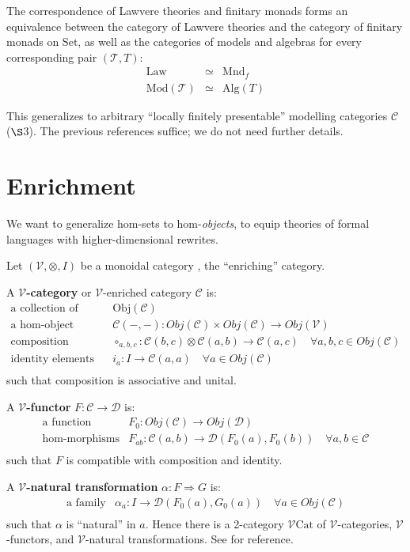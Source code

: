 \documentclass{amsart}
\theoremstyle{definition}
\newcommand{\Set}{\mathrm{Set}}
\newcommand{\Cat}{\mathrm{Cat}}
\newcommand{\Alg}{\mathrm{Alg}}
\newcommand{\Mod}{\mathrm{Mod}}
\newcommand{\V}{\mathscr{V}}
\newcommand{\D}{\mathscr{D}}
\newcommand{\C}{\mathscr{C}}
\newcommand{\T}{\mathscr{T}}
\newcommand{\maps}{\colon}
\begin{document}
The correspondence of Lawvere theories and finitary monads forms an equivalence between the category of Lawvere theories and the category of finitary monads on $\Set$, as well as the categories of models and algebras for every corresponding pair $(\T, T)$:
\[\begin{array}{rcl}
	\mathrm{Law} & \simeq & \mathrm{Mnd}_f\\
	\Mod(\T) & \simeq & \Alg(T)
\end{array}\]

This generalizes to arbitrary ``locally finitely presentable'' modelling categories $\C$ ($\S$3). The previous references suffice; we do not need further details. 

\section{Enrichment}
We want to generalize hom-sets to hom-\textit{objects}, to equip theories of formal languages with higher-dimensional rewrites.

Let $(\V,\otimes,I)$ be a monoidal category \cite{maclane}, the ``enriching'' category.

A \textbf{$\V$-category} or $\V$-enriched category $\C$ is:
\[\begin{array}{rl}
\text{a collection of objects} & \text{Obj}(\C)\\
\text{a hom-object function} & \C(-,-)\maps Obj(\C) \times Obj(\C) \to Obj(\V)\\
\text{composition morphisms} & \circ_{a,b,c}\maps\C(b,c) \otimes \C(a,b) \to \C(a,c) \quad \forall a,b,c \in Obj(\C)\\
\text{identity elements} & i_a\maps I\to\C(a,a) \quad \forall a \in Obj(\C)\\
\end{array}\]
such that composition is associative and unital.

A \textbf{$\V$-functor} $F\maps\C \to \D$ is:
\[\begin{array}{rl}
\text{a function} & F_0\maps Obj(\C) \to Obj(\D)\\
\text{hom-morphisms} & F_{ab}\maps \C(a,b) \to \D(F_0(a),F_0(b)) \quad \forall a,b \in \C\\
\end{array}\]
such that $F$ is compatible with composition and identity.

A \textbf{$\V$-natural transformation} $\alpha\maps F \Rightarrow G$ is:
\[\begin{array}{rl}
\text{a family} & \alpha_a\maps I \to \D(F_0(a),G_0(a)) \quad \forall a \in Obj(\C)\\
\end{array}\]
such that $\alpha$ is ``natural'' in $a$. Hence there is a 2-category \textbf{$\V\Cat$} of $\V$-categories, $\V$-functors, and $\V$-natural transformations. See \cite{enrich} for reference.
\end{document}
